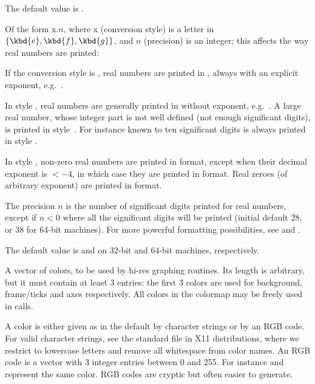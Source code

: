 {The default value is .

\label{se:def,format}
Of the form x$.n$, where x (conversion style)
is a letter in $\{\kbd{e},\kbd{f},\kbd{g}\}$, and $n$ (precision) is an
integer; this affects the way real numbers are printed:

\item If the conversion style is , real numbers are printed in
, always with an explicit exponent,
e.g.~.

\item In style , real numbers are generally printed in  without exponent, e.g.~. A large
real number, whose integer part is not well defined (not enough significant
digits), is printed in style~. For instance  known to
ten significant digits is always printed in style .

\item In style , non-zero real numbers are printed in  format,
except when their decimal exponent is $< -4$, in which case they are printed in
 format. Real zeroes (of arbitrary exponent) are printed in 
format.

The precision $n$ is the number of significant digits printed for real
numbers, except if $n<0$ where all the significant digits will be printed
(initial default 28, or 38 for 64-bit machines). For more powerful formatting
possibilities, see  and .

The default value is  and  on 32-bit and
64-bit machines, respectively.

\label{se:def,graphcolormap}
A vector of colors, to be
used by hi-res graphing routines. Its length is arbitrary, but it must
contain at least 3 entries: the first 3 colors are used for background,
frame/ticks and axes respectively. All colors in the colormap may be freely
used in  calls.

A color is either given as in the default by character strings or by an RGB
code. For valid character strings, see the standard  file in X11
distributions, where we restrict to lowercase letters and remove all
whitespace from color names. An RGB code is a vector with 3 integer entries
between 0 and 255. For instance \kbd{[250, 235, 215]} and
 represent the same color. RGB codes are cryptic but
often easier to generate.

}
